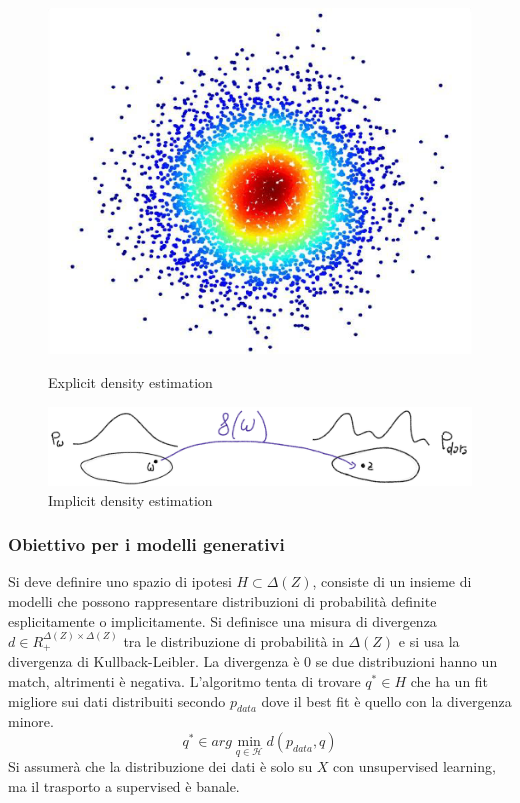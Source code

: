 		\begin{figure}
			\centering
			\begin{minipage}{.5\textwidth}
				\centering
				\includegraphics[width=0.7\linewidth]{imgs/chapter12/img18}
				\caption{Explicit density estimation}
				\label{fig:chapter12-18}
			\end{minipage}%
			\begin{minipage}{.5\textwidth}
				\centering
				\includegraphics[width=1\linewidth]{imgs/chapter12/img19}
				\caption{Implicit density estimation}
				\label{fig:chapter12-19}
			\end{minipage}
		\end{figure}
		
		
		\subsubsection{Obiettivo per i modelli generativi}
		Si deve definire uno spazio di ipotesi $H\subset \Delta(Z)$, consiste di un insieme di modelli che possono rappresentare distribuzioni di probabilit\`a definite esplicitamente o implicitamente.
		Si definisce una misura di divergenza $d\in R_+^{\Delta(Z)\times\Delta(Z)}$ tra le distribuzione di probabilit\`a in $\Delta(Z)$ e si usa la divergenza di Kullback-Leibler.
		La divergenza \`e $0$ se due distribuzioni hanno un match, altrimenti \`e negativa.
		L'algoritmo tenta di trovare $q^*\in H$ che ha un fit migliore sui dati distribuiti secondo $p_{data}$ dove il best fit \`e quello con la divergenza minore.
		$$q^*\in arg\min\limits_{q\in\mathcal{H}}d(p_{data},q)$$
		Si assumer\`a che la distribuzione dei dati \`e solo su $X$ con unsupervised learning, ma il trasporto a supervised \`e banale.


